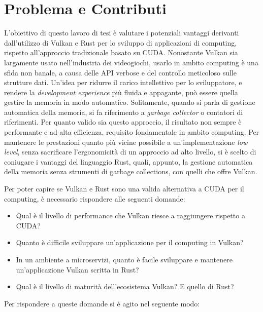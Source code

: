 \section[Problema e Contributi]{Problema e Contributi}

L'obiettivo di questo lavoro di tesi è valutare i potenziali vantaggi derivanti dall'utilizzo di Vulkan e Rust per lo sviluppo di applicazioni di computing, rispetto all'approccio tradizionale basato su \gls{CUDA}.
Nonostante Vulkan sia largamente usato nell'industria dei videogiochi, usarlo in ambito computing è una sfida non banale, a causa delle \gls{API} verbose e del controllo meticoloso sulle strutture dati.
Un'idea per ridurre il carico intellettivo per lo sviluppatore, e rendere la \textit{development experience} più fluida e appagante, può essere quella gestire la memoria in modo automatico. Solitamente, quando si parla di gestione automatica della memoria, si fa riferimento a \textit{garbage collector} o contatori di riferimenti. Per quanto valido sia questo approccio, il risultato non sempre è performante e ad alta efficienza, requisito fondamentale in ambito computing. Per mantenere le prestazioni quanto più vicine possibile a un'implementazione \textit{low level}, senza sacrificare l'ergonomicità di un approccio ad alto livello, si è scelto di coniugare i vantaggi del linguaggio Rust, quali, appunto, la gestione automatica della memoria senza strumenti di garbage collections, con quelli che offre Vulkan.

Per poter capire se Vulkan e Rust sono una valida alternativa a \gls{CUDA} per il computing, è necessario rispondere alle seguenti domande:

\begin{itemize}
    \item Qual è il livello di performance che Vulkan riesce a raggiungere rispetto a \gls{CUDA}?
    \item Quanto è difficile sviluppare un'applicazione per il computing in Vulkan?
    \item In un ambiente a microservizi, quanto è facile sviluppare e mantenere un'applicazione Vulkan scritta in Rust?
    \item Qual è il livello di maturità dell'ecosistema Vulkan? E quello di Rust?
\end{itemize}

Per rispondere a queste domande si è agito nel seguente modo:

